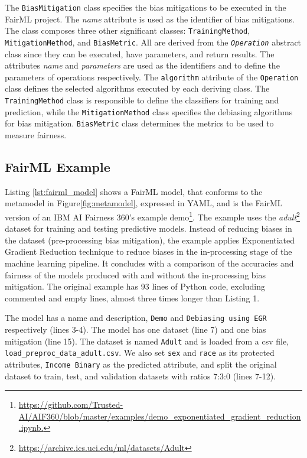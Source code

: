 \documentclass[sigconf]{acmart}
\begin{document}
{		The \texttt{BiasMitigation} class specifies the bias mitigations to be executed in the FairML project. The \textit{name} attribute is used as the identifier of bias mitigations. The class composes three other significant classes: \texttt{Training\-Method}, \texttt{Mitigation\-Method}, and \texttt{Bias\-Metric}. All are derived from the \texttt{\textit{Operation}} abstract class since they can be executed, have parameters, and return results. The attributes \textit{name} and \textit{parameters} are used as the identifiers and to define the parameters of operations respectively. The \texttt{algorithm} attribute of the \texttt{Operation} class defines the selected algorithms executed by each deriving class. The \texttt{TrainingMethod} class is responsible to define the classifiers for training and prediction, while the \texttt{MitigationMethod} class specifies the debiasing algorithms for bias mitigation. \texttt{BiasMetric} class determines the metrics to be used to measure fairness. 
		
		\subsection{FairML Example}
		\label{sec:fairml_example}	
		Listing \ref{lst:fairml_model} shows a FairML model, that conforms to the metamodel in Figure\ref{fig:metamodel}, expressed in YAML, and is the FairML version of an IBM AI Fairness 360's example demo\footnote{\url{https://github.com/Trusted-AI/AIF360/blob/master/examples/demo_exponentiated_gradient_reduction.ipynb.}}. 	
		The example uses the \textit{adult}\footnote{\url{https://archive.ics.uci.edu/ml/datasets/Adult}} dataset for training and testing predictive models. Instead of reducing biases in the dataset (pre-processing bias mitigation), the example applies Exponentiated Gradient Reduction technique to reduce biases in the in-processing stage of the machine learning pipeline. It concludes with a comparison of the accuracies and fairness of the models produced with and without the in-processing bias mitigation. The original example has 93 lines of Python code, excluding commented and empty lines, almost three times longer than Listing 1.
		
		The model has a name and description, \texttt{Demo} and \texttt{Debiasing using EGR} respectively (lines 3-4). The model has one dataset (line 7) and one bias mitigation (line 15). The dataset is named \texttt{Adult} and is loaded from a csv file, \texttt{load\_preproc\_data\_adult.csv}. We also set \texttt{sex} and \texttt{race} as its protected attributes, \texttt{Income Binary} as the predicted attribute, and split the original dataset to train, test, and validation datasets with ratios 7:3:0 (lines 7-12). 
		
}
\end{document}
